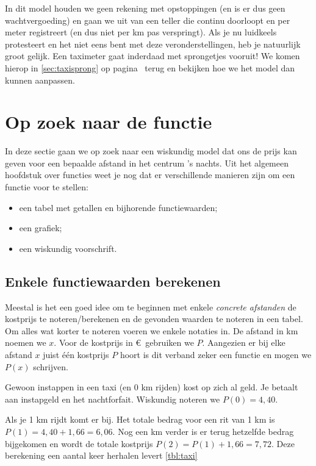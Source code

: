 In dit model houden we geen rekening met opstoppingen (en is er dus geen wachtvergoeding) en gaan we uit van een teller die continu doorloopt en per meter registreert (en dus niet per km pas verspringt). Als je nu luidkeels protesteert en het niet eens bent met deze veronderstellingen, heb je natuurlijk groot gelijk. Een taximeter gaat inderdaad met sprongetjes vooruit! We komen hierop in \cref{sec:taxisprong} op pagina~\pageref{sec:taxisprong} terug en bekijken hoe we het model dan kunnen aanpassen. 

\section{Op zoek naar de functie}
In deze sectie gaan we op zoek naar een wiskundig model dat ons de prijs kan geven voor een bepaalde afstand in het centrum 's nachts.
Uit het algemeen hoofdstuk over functies weet je nog dat er verschillende manieren zijn om een functie voor te stellen:
\begin{itemize}
\item een tabel met getallen en bijhorende functiewaarden;
\item een grafiek;
\item een wiskundig voorschrift.
\end{itemize}

\subsection{Enkele functiewaarden berekenen}
Meestal is het een goed idee om te beginnen met enkele \emph{concrete afstanden} de kostprijs te noteren/berekenen en de gevonden waarden te noteren in een tabel. Om alles wat korter te noteren voeren we enkele notaties in. De afstand in km noemen we $x$. Voor de kostprijs in \euro \ gebruiken we $P$. Aangezien er bij elke afstand $x$ juist één kostprijs $P$ hoort is dit verband zeker een functie en mogen we $P(x)$ schrijven.

Gewoon instappen in een taxi (en 0 km rijden) kost op zich al geld. Je betaalt  aan instapgeld en het nachtforfait. Wiskundig noteren we $P(0)=4,40$.

Als je 1 km rijdt komt er  bij. Het totale bedrag voor een rit van 1 km is $P(1)=4,40+1,66=6,06$. Nog een km verder is er terug hetzelfde bedrag bijgekomen en wordt de totale kostprijs $P(2)=P(1)+1,66=7,72$. Deze berekening een aantal keer herhalen levert \cref{tbl:taxi}

